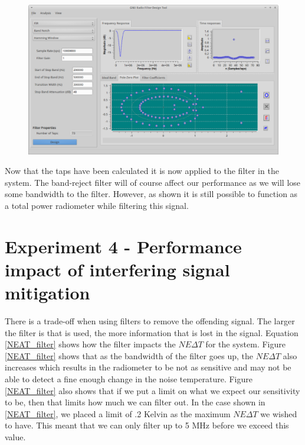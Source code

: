 \begin{figure}[h!tb] \centering

\includegraphics[width=\textwidth]{Images/GNURadio_Filter_dsn.png}
\label{GRC_Filter_DSN}
\end{figure}  

Now that the taps have been calculated it is now applied to the filter in the system.  The band-reject filter will of course affect our performance as we will lose some bandwidth to the filter.  However, as shown it is still possible to function as a total power radiometer while filtering this signal.  

\section{Experiment 4 - Performance impact of interfering signal mitigation}\label{Exp4}
There is a trade-off when using filters to remove the offending signal.  The larger the filter is that is used, the more information that is lost in the signal.  Equation \ref{NEAT_filter} shows how the filter impacts the $NE\Delta T$ for the system.  Figure \ref{NEAT_filter} shows that as the bandwidth of the filter goes up, the $NE\Delta T$ also increases which results in the radiometer to be not as sensitive and may not be able to detect a fine enough change in the noise temperature.  Figure \ref{NEAT_filter} also shows that if we put a limit on what we expect our sensitivity to be, then that limits how much we can filter out.  In the case shown in \ref{NEAT_filter}, we placed a limit of .2 Kelvin as the maximum $NE\Delta T$ we wished to have.  This meant that we can only filter up to 5 MHz before we exceed this value.

